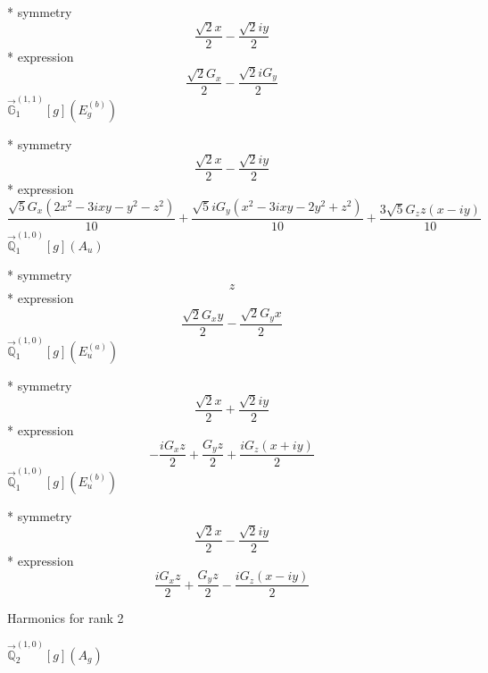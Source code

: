 \documentclass[fleqn,8pt]{jsarticle}
\begin{document}
\noindent\quad ** symmetry
\begin{dmath*}
\frac{\sqrt{2} x}{2} - \frac{\sqrt{2} i y}{2}
\end{dmath*}
\noindent\quad ** expression
\begin{dmath*}
\frac{\sqrt{2} G_{x}}{2} - \frac{\sqrt{2} i G_{y}}{2}
\end{dmath*}
\noindent\quad $\vec{\mathbb{G}}_{1}^{(1,1)}[g](E_{g}^{(b)})$

\noindent\quad ** symmetry
\begin{dmath*}
\frac{\sqrt{2} x}{2} - \frac{\sqrt{2} i y}{2}
\end{dmath*}
\noindent\quad ** expression
\begin{dmath*}
\frac{\sqrt{5} G_{x} \left(2 x^{2} - 3 i x y - y^{2} - z^{2}\right)}{10} + \frac{\sqrt{5} i G_{y} \left(x^{2} - 3 i x y - 2 y^{2} + z^{2}\right)}{10} + \frac{3 \sqrt{5} G_{z} z \left(x - i y\right)}{10}
\end{dmath*}
\noindent\quad $\vec{\mathbb{Q}}_{1}^{(1,0)}[g](A_{u})$

\noindent\quad ** symmetry
\begin{dmath*}
z
\end{dmath*}
\noindent\quad ** expression
\begin{dmath*}
\frac{\sqrt{2} G_{x} y}{2} - \frac{\sqrt{2} G_{y} x}{2}
\end{dmath*}
\noindent\quad $\vec{\mathbb{Q}}_{1}^{(1,0)}[g](E_{u}^{(a)})$

\noindent\quad ** symmetry
\begin{dmath*}
\frac{\sqrt{2} x}{2} + \frac{\sqrt{2} i y}{2}
\end{dmath*}
\noindent\quad ** expression
\begin{dmath*}
- \frac{i G_{x} z}{2} + \frac{G_{y} z}{2} + \frac{i G_{z} \left(x + i y\right)}{2}
\end{dmath*}
\noindent\quad $\vec{\mathbb{Q}}_{1}^{(1,0)}[g](E_{u}^{(b)})$

\noindent\quad ** symmetry
\begin{dmath*}
\frac{\sqrt{2} x}{2} - \frac{\sqrt{2} i y}{2}
\end{dmath*}
\noindent\quad ** expression
\begin{dmath*}
\frac{i G_{x} z}{2} + \frac{G_{y} z}{2} - \frac{i G_{z} \left(x - i y\right)}{2}
\end{dmath*}

\noindent * Harmonics for rank 2

\noindent\quad $\vec{\mathbb{Q}}_{2}^{(1,0)}[g](A_{g})$
\end{document}
